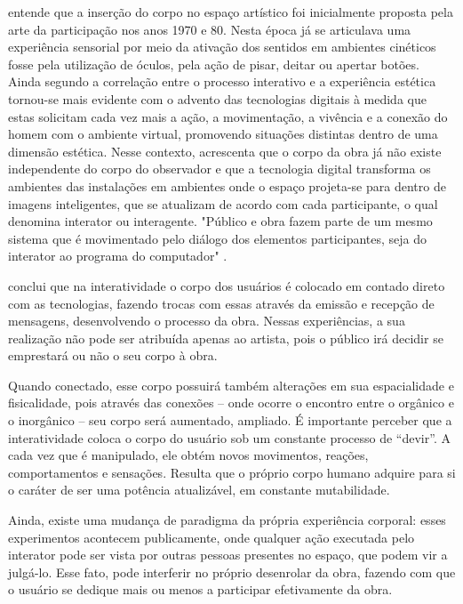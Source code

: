  entende que a inserção do corpo no espaço artístico foi inicialmente proposta pela arte da participação nos anos 1970 e 80. Nesta época já se articulava uma experiência sensorial por meio da ativação dos sentidos em ambientes cinéticos fosse pela utilização de óculos, pela ação de pisar, deitar ou apertar botões. Ainda segundo  a correlação entre o processo interativo e a experiência estética tornou-se mais evidente com o advento das tecnologias digitais à medida que estas solicitam cada vez mais a ação, a movimentação, a vivência e a conexão do homem com o ambiente virtual, promovendo situações distintas dentro de uma dimensão estética. Nesse contexto,  acrescenta que o corpo da obra já não existe independente do corpo do observador e que a tecnologia digital transforma os ambientes das instalações em ambientes onde o espaço projeta-se para dentro de imagens inteligentes, que se atualizam de acordo com cada participante, o qual denomina interator ou interagente. "Público e obra fazem parte de um mesmo sistema que é movimentado pelo diálogo dos elementos participantes, seja do interator ao programa do computador" .


 conclui que na interatividade o corpo dos usuários é colocado em contado direto com as tecnologias, fazendo trocas com essas através da emissão e recepção de mensagens, desenvolvendo o processo da obra. Nessas experiências, a sua realização não pode ser atribuída apenas ao artista, pois o público irá decidir se emprestará ou não o seu corpo à obra.

Quando conectado, esse corpo possuirá também alterações em sua espacialidade e fisicalidade, pois através das conexões – onde ocorre o encontro entre o orgânico e o inorgânico – seu corpo será aumentado, ampliado. É importante perceber que a interatividade coloca o corpo do usuário sob um constante processo de “devir”. A cada vez que é manipulado, ele obtém novos movimentos, reações, comportamentos e sensações. Resulta que o próprio corpo humano adquire para si o caráter de ser uma potência atualizável, em constante mutabilidade.\cite{vares}


Ainda, existe uma mudança de paradigma da própria experiência corporal: esses experimentos acontecem publicamente, onde qualquer ação executada pelo interator pode ser vista por outras pessoas presentes no espaço, que podem vir a julgá-lo. Esse fato, pode interferir no próprio desenrolar da obra, fazendo com que o usuário se dedique mais ou menos a participar efetivamente da obra.\cite{vares}


